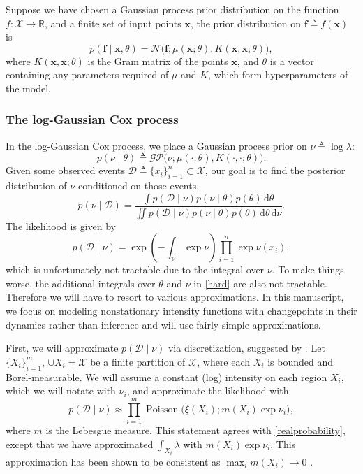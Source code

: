 \documentclass{article}
\newcommand{\deq}{\triangleq}
\newcommand{\cm}[1]{\mathcal{#1}}
\newcommand{\data}{\cm{D}}
\newcommand{\given}{\mid}
\newcommand{\R}{\mathbb{R}}
\newcommand{\intd}[1]{\,\mathrm{d}#1}
\DeclareMathOperator{\poisson}{Poisson}
\begin{document}
Suppose we have chosen a Gaussian process prior distribution on the
function $f\colon \cm{X} \to \R$, and a finite set of input points
$\bm{x}$, the prior distribution on $\bm{f} \deq f(\bm{x})$ is
\begin{equation*}
 p(\bm{f} \given \bm{x}, \theta)
 =
 \cm{N}
 \bigl(
   \bm{f};
   \mu(\bm{x}; \theta),
   K(\bm{x}, \bm{x}; \theta)
 \bigr),
\end{equation*}
where $K(\bm{x}, \bm{x}; \theta)$ is the Gram matrix of the points
$\bm{x}$, and $\theta$ is a vector containing any parameters required
of $\mu$ and $K$, which form hyperparameters of the model.

\subsubsection{The log-Gaussian Cox process}

In the log-Gaussian Cox process, we place a Gaussian process prior on
$\nu \deq \log \lambda$:
\begin{equation*}
  p(\nu \given \theta) 
  \deq 
  \cm{GP}\bigl(\nu; \mu(\cdot; \theta), K(\cdot, \cdot; \theta)\bigr).
\end{equation*}
Given some observed events $\data \deq \lbrace x_i \rbrace_{i=1}^n
\subset \cm{X}$, our goal is to find the posterior distribution of
$\nu$ conditioned on those events,
\begin{equation}
  \label{nuposterior}
  p(\nu \given \data)
  =
  \frac
  {
    \int p(\data \given \nu)
    p(\nu \given \theta)
    p(\theta) \intd{\theta}
  }
  {
    \iint p(\data \given \nu)
    p(\nu \given \theta) 
    p(\theta) 
    \intd{\theta} \intd{\nu}
  }.
\end{equation}
The likelihood is given by
\begin{equation}
  \label{hard}
  p(\data \given \nu) 
  =
  \exp\left( -\int_{\cm{V}} \exp \nu \right) \prod_{i = 1}^n \exp \nu(x_i),
\end{equation}
which is unfortunately not tractable due to the integral over $\nu$.
To make things worse, the additional integrals over $\theta$ and $\nu$
in \eqref{hard} are also not tractable.  Therefore we will have to
resort to various approximations.  In this manuscript, we focus on
modeling nonstationary intensity functions with changepoints in their
dynamics rather than inference and will use fairly simple
approximations.

First, we will approximate $p(\data \given \nu)$ via discretization,
suggested by \citet{moller}.  Let $\lbrace X_i \rbrace_{i=1}^m$, $\cup
X_i = \cm{X}$ be a finite partition of $\cm{X}$, where each $X_i$ is
bounded and Borel-measurable. We will assume a constant (log)
intensity on each region $X_i$, which we will notate with $\nu_i$, and
approximate the likelihood with
\begin{equation*}
  p(\data \given \nu) 
  \approx
  \prod_{i=1}^m
  \poisson\bigl(\xi(X_i); m(X_i) \exp \nu_i\bigr),
\end{equation*}
where $m$ is the Lebesgue measure.  This statement agrees with
\eqref{realprobability}, except that we have approximated $\int_{X_i}
\lambda$ with $m(X_i) \exp \nu_i$.  This approximation has been shown
to be consistent as $\max_i m(X_i) \to 0$ \citep{ghosh}.
\end{document}
